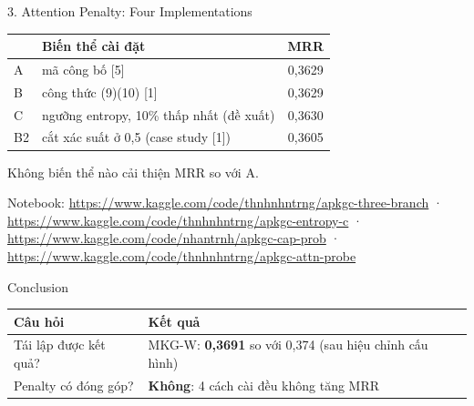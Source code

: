 \documentclass[aspectratio=169,10pt]{beamer}
\newcommand{\cit}[1]{{\footnotesize\textcolor{hcmusblue}{[#1]}}}
\begin{document}
\begin{frame}{3. Attention Penalty: Four Implementations}
\small
\vspace{8pt}
\centering
{\footnotesize
\begin{tabular}{llc}
\toprule
& \textbf{Biến thể cài đặt} & \textbf{MRR}\\
\midrule
A & mã công bố \cit{5} & 0,3629\\
B & công thức (9)(10) \cit{1} & 0,3629\\
C & ngưỡng entropy, 10\% thấp nhất (đề xuất) & 0,3630\\
B2 & cắt xác suất ở 0,5 (case study \cit{1}) & 0,3605\\
\bottomrule
\end{tabular}}

\smallskip
{\scriptsize Không biến thể nào cải thiện MRR so với A.}

\vfill
{\tiny\color{black!60} Notebook: \url{https://www.kaggle.com/code/thnhnhntrng/apkgc-three-branch} · \url{https://www.kaggle.com/code/thnhnhntrng/apkgc-entropy-c} · \url{https://www.kaggle.com/code/nhantrnh/apkgc-cap-prob} · \url{https://www.kaggle.com/code/thnhnhntrng/apkgc-attn-probe}}
\end{frame}

\begin{frame}{Conclusion}
\footnotesize
\centering
\begin{tabular}{>{\raggedright\arraybackslash}p{3.8cm}>{\raggedright\arraybackslash}p{7.6cm}}
\toprule
\textbf{Câu hỏi} & \textbf{Kết quả}\\
\midrule
Tái lập được kết quả?
& MKG-W: \textbf{0,3691} so với 0,374 (sau hiệu chỉnh cấu hình)\\
\addlinespace
Penalty có đóng góp?
& \textbf{Không}: 4 cách cài đều không tăng MRR\\
\bottomrule
\end{tabular}

\end{frame}
\end{document}
